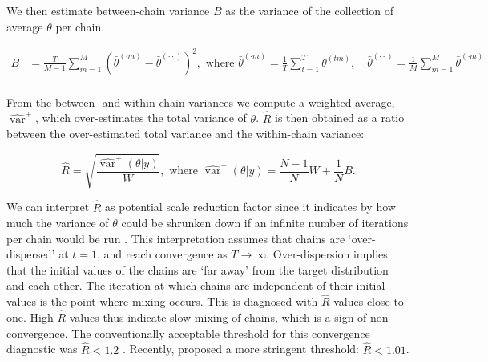 \documentclass[article]{jss}
\begin{document}
We then estimate between-chain variance $B$ as the variance of the collection of average $\theta$ per chain.

\begin{align*}
B&=\frac{T}{M-1} \sum_{m=1}^{M}\left(\bar{\theta}^{(\cdot m)}-\bar{\theta}^{(\cdot \cdot)}\right)^{2}, \text { where } \bar{\theta}^{(\cdot m)}=\frac{1}{T} \sum_{t=1}^{T} \theta^{(t m)}, \quad \bar{\theta}^{(\cdot \cdot)}=\frac{1}{M} \sum_{m=1}^{M} \bar{\theta}^{(\cdot m)} \\
\end{align*}

From the between- and within-chain variances we compute a weighted average, $\widehat{\operatorname{var}}^{+}$, which over-estimates the total variance of $\theta$. $\widehat{R}$ is then obtained as a ratio between the over-estimated total variance and the within-chain variance:

\begin{equation*}
\widehat{R}=\sqrt{\frac{\widehat{\operatorname{var}}^{+}(\theta | y)}{W}},
\text{ where } \widehat{\operatorname{var}}^{+}(\theta | y)=\frac{N-1}{N} W+\frac{1}{N} B.
\end{equation*}



% 

We can interpret $\widehat{R}$ as potential scale reduction factor since it indicates by how much the variance of $\theta$ could be shrunken down if an infinite number of iterations per chain would be run \citep{gelm92}. This interpretation assumes that chains are `over-dispersed' at $t=1$, and reach convergence as $T \to \infty$. Over-dispersion implies that the initial values of the chains are `far away' from the target distribution and each other. The iteration at which chains are independent of their initial values is the point where mixing occurs. This is diagnosed with $\widehat{R}$-values close to one. %
High $\widehat{R}$-values thus indicate slow mixing of chains, which is a sign of non-convergence. %
The conventionally acceptable threshold for this convergence diagnostic was $\widehat{R} < 1.2$ \citep{gelm92}. Recently, \cite{veht19} proposed a more stringent threshold: $\widehat{R} < 1.01$. 
\end{document}
